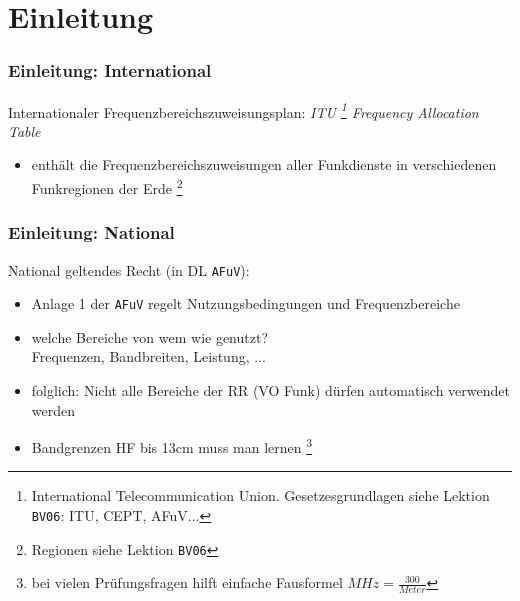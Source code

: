 

\subtitle{Betriebstechnik/Vorschriften 09: \\
          Betriebsarten, Sendearten, Frequenzen \\[2em]}
\date{Stand 11.12.2014}



\section{Einleitung}

\begin{frame}
    \frametitle{Einleitung: International}

    Internationaler Frequenzbereichszuweisungsplan: \emph{ITU
    \footnote{International Telecommunication Union. Gesetzesgrundlagen siehe
    Lektion \texttt{BV06}: ITU, CEPT, AFuV...} Frequency Allocation Table}

    \begin{itemize}
        \item enthält die Frequenzbereichszuweisungen aller Funkdienste in
              verschiedenen Funkregionen der Erde
              \footnote{Regionen siehe Lektion \texttt{BV06}}
    \end{itemize}

\end{frame}

\begin{frame}
    \frametitle{Einleitung: National}

    National geltendes Recht (in DL \texttt{AFuV}):

    \begin{itemize}
        \item Anlage 1 der \texttt{AFuV} regelt Nutzungsbedingungen und Frequenzbereiche
        \item welche Bereiche von wem wie genutzt? \\
              Frequenzen, Bandbreiten, Leistung, ...
        \item folglich: Nicht alle Bereiche der RR (VO Funk) dürfen automatisch
              verwendet werden
        \item Bandgrenzen HF bis 13cm muss man lernen %
              \footnote{bei vielen Prüfungsfragen hilft einfache Fausformel
                        $MHz = \frac{300}{Meter}$}
    \end{itemize}

\end{frame}

